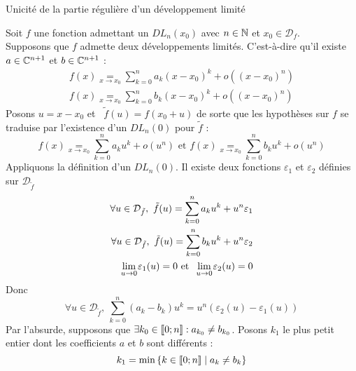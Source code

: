 \documentclass{article}
\begin{document}
\begin{question_kholle}
	{Unicité de la partie régulière d'un développement limité}

	Soit $f$ une fonction admettant un $DL_n(x_0)$ avec $n \in \mathbb N$ et $x_0 \in \mathcal{D}_f$. \\
	Supposons que $f$ admette deux développements limités. C'est-à-dire qu'il existe $a \in \mathbb C^{n+1}$ et $b \in \mathbb C^{n+1}$ \tqs :
	\begin{equation*}
		\begin{aligned}
			f(x) \underset{x \rightarrow x_0}{=} \sum_{k=0}^{n} a_k (x - x_0)^k + o\left((x-x_0)^n\right) \\
			f(x) \underset{x \rightarrow x_0}{=} \sum_{k=0}^{n} b_k (x - x_0)^k + o\left((x-x_0)^n\right)
		\end{aligned}
	\end{equation*}
	Posons $u = x - x_0$ et  $\tilde{f}(u) = f(x_0+u)$ de sorte que les hypothèses sur $f$ se traduise par l'existence d'un $DL_n(0)$ pour $\tilde{f}$ :
	\begin{equation*}
		f(x) \underset{x \rightarrow x_0}{=} \sum_{k=0}^{n} a_k u^k + o\left(u^n\right)
		\text{ et }
		f(x) \underset{x \rightarrow x_0}{=} \sum_{k=0}^{n} b_k u^k + o\left(u^n\right)
	\end{equation*}
	Appliquons la définition d'un $DL_n(0)$. Il existe deux fonctions $\varepsilon_1$ et $\varepsilon_2$ définies sur $\mathcal{D}_{\tilde{f}}$ \tqs
	\begin{equation*}
		\begin{aligned}
			\forall u \in \mathcal{D}_{\tilde{f}}, \ \tilde{f}(u) = \sum_{k=0}^{n} a_k u^k + u^n \varepsilon_1 \\
			\forall u \in \mathcal{D}_{\tilde{f}}, \ \tilde{f}(u) = \sum_{k=0}^{n} b_k u^k + u^n \varepsilon_2 \\
			\lim\limits_{\;u \to 0\;}\!\! \varepsilon_1(u) = 0 \text{ et } \lim\limits_{\;u \to 0\;}\!\! \varepsilon_2(u) = 0
		\end{aligned}
	\end{equation*}
	Donc
	\begin{equation*}
		\forall u \in \mathcal{D}_{\tilde{f}}, \
		\sum_{k=0}^{n} (a_k - b_k) u^k = u^n \left( \varepsilon_2(u) - \varepsilon_1(u) \right)
	\end{equation*}
	Par l'absurde, supposons que $\exists k_0 \in [\![ 0; n ]\!] : a_{k_0} \neq b_{k_0}$. Posons $k_1$ le plus petit entier dont les coefficients $a$ et $b$ sont différents :
	\begin{equation*}
		k_1 = \min \left\{ k \in \lient 0;n \rient \;|\; a_k \neq b_k \right\}

\end{equation*}
\end{question_kholle}
\end{document}
